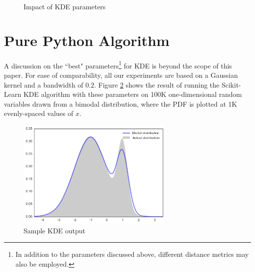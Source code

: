 \documentclass[11pt]{article}
\begin{document}
\begin{figure}[h!]
\centering
{}
\caption{Impact of KDE parameters}
\label{fig:kde_params}
\end{figure}

\newpage

\section{Pure Python Algorithm}

A discussion on the ``best" parameters\footnote{In addition to the parameters discussed above, different distance metrics may also be employed.} for KDE is beyond the scope of this paper.  For ease of comparability, all our experiments are based on a Gaussian kernel and a bandwidth of $0.2$. Figure \ref{fig:sample_kde} shows the result of running the Scikit-Learn KDE algorithm with these parameters on 100K one-dimensional random variables drawn from a bimodal distribution, where the PDF is plotted at 1K evenly-spaced values of $x$.

\begin{figure}[h!]
\centering
\includegraphics[width=3in]{img/sample_kde.png}
\caption{Sample KDE output}
\label{fig:sample_kde}
\end{figure}
\end{document}
